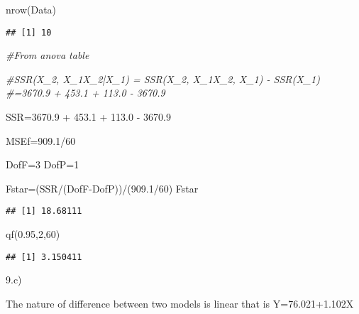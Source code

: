 \documentclass[
]{article}
\newenvironment{Shaded}{\begin{snugshade}}{\end{snugshade}}
\newcommand{\CommentTok}[1]{\textcolor[rgb]{0.56,0.35,0.01}{\textit{#1}}}
\newcommand{\DecValTok}[1]{\textcolor[rgb]{0.00,0.00,0.81}{#1}}
\newcommand{\FloatTok}[1]{\textcolor[rgb]{0.00,0.00,0.81}{#1}}
\newcommand{\FunctionTok}[1]{\textcolor[rgb]{0.00,0.00,0.00}{#1}}
\newcommand{\NormalTok}[1]{#1}
\newcommand{\OtherTok}[1]{\textcolor[rgb]{0.56,0.35,0.01}{#1}}
\newcommand{\SpecialCharTok}[1]{\textcolor[rgb]{0.00,0.00,0.00}{#1}}
\begin{document}
\begin{Shaded}
\begin{Highlighting}[]
\FunctionTok{nrow}\NormalTok{(Data)}
\end{Highlighting}
\end{Shaded}

\begin{verbatim}
## [1] 10
\end{verbatim}

\begin{Shaded}
\begin{Highlighting}[]
\CommentTok{\#From anova table}

\CommentTok{\#SSR(X\_2, X\_1X\_2|X\_1) = SSR(X\_2, X\_1X\_2, X\_1) {-} SSR(X\_1)}
\CommentTok{\#=3670.9 + 453.1 + 113.0 {-} 3670.9}

\NormalTok{SSR}\OtherTok{=}\FloatTok{3670.9} \SpecialCharTok{+} \FloatTok{453.1} \SpecialCharTok{+} \FloatTok{113.0} \SpecialCharTok{{-}} \FloatTok{3670.9}

\NormalTok{MSEf}\OtherTok{=}\FloatTok{909.1}\SpecialCharTok{/}\DecValTok{60}

\NormalTok{DofF}\OtherTok{=}\DecValTok{3}
\NormalTok{DofP}\OtherTok{=}\DecValTok{1}

\NormalTok{Fstar}\OtherTok{=}\NormalTok{(SSR}\SpecialCharTok{/}\NormalTok{(DofF}\SpecialCharTok{{-}}\NormalTok{DofP))}\SpecialCharTok{/}\NormalTok{(}\FloatTok{909.1}\SpecialCharTok{/}\DecValTok{60}\NormalTok{)}
\NormalTok{Fstar}
\end{Highlighting}
\end{Shaded}

\begin{verbatim}
## [1] 18.68111
\end{verbatim}

\begin{Shaded}
\begin{Highlighting}[]
\FunctionTok{qf}\NormalTok{(}\FloatTok{0.95}\NormalTok{,}\DecValTok{2}\NormalTok{,}\DecValTok{60}\NormalTok{)}
\end{Highlighting}
\end{Shaded}

\begin{verbatim}
## [1] 3.150411
\end{verbatim}

9.c)

The nature of difference between two models is linear that is
Y=76.021+1.102X
\end{document}
